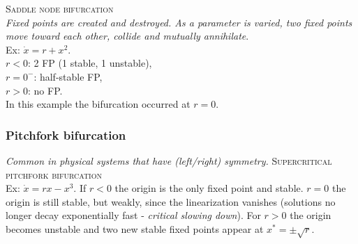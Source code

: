 \textsc{Saddle node bifurcation}\\
\emph{Fixed points are created and destroyed. As a parameter is varied, two fixed points move toward each other, collide and mutually annihilate}.\\
Ex: $\dot{x}=r+x^2$.\\ $r<0$: 2 FP (1 stable, 1 unstable),\\ $r=0^-$: half-stable FP, \\ $r>0$: no FP.\\ In this example the bifurcation occurred at $r=0$.
\begin{center}
\end{center}
\vspace{0.2cm}

\subsubsection{Pitchfork bifurcation}
\emph{Common in physical systems that have (left/right) symmetry.}
\textsc{Supercritical pitchfork bifurcation}\\
Ex: $\dot{x}=rx-x^3$. If $r<0$ the origin is the only fixed point and stable. $r=0$ the origin is still stable, but weakly, since the linearization vanishes (solutions no longer decay exponentially fast - \emph{critical slowing down}).  For $r>0$ the origin becomes unstable and two new stable fixed points appear at $x^*=\pm \sqrt{r}$.
\begin{center}
\end{center}
\vspace{0.2cm}


